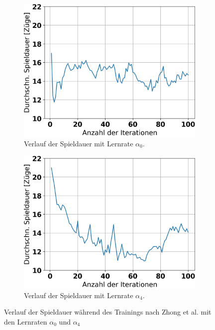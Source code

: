 \begin{figure}[ht!]%
	\begin{subfigure}[b]{0.48\textwidth}
		\includegraphics[width=\textwidth]{Bilder/ensemble-training/a_0_001/graph_game_lengths.png}
		\caption{Verlauf der Spieldauer mit Lernrate $\alpha_0$.}
		\label{fig:f11}
	\end{subfigure}
	\hfill
	\begin{subfigure}[b]{0.48\textwidth}
		\includegraphics[width=\textwidth]{Bilder/ensemble-training/e_0_00001/graph_game_lengths.png}
		\caption{Verlauf der Spieldauer mit Lernrate $\alpha_4$.}
		\label{fig:f12}
	\end{subfigure}
	\caption{Verlauf der Spieldauer während des Trainings nach Zhong et al. mit den Lernraten $\alpha_0$ und $\alpha_4$}
\end{figure}

